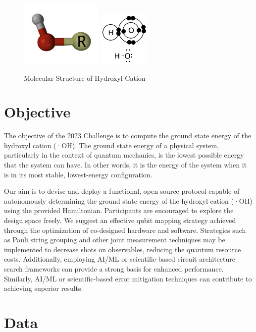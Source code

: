 \documentclass{article}
\begin{document}
\begin{figure}[h]
\centering
\includegraphics[width=4cm]{Images/Hydroxyl3D.png}
\includegraphics[width=2.5cm]{Images/Hydroxyl-OH.png}
\caption{Molecular Structure of Hydroxyl Cation}
\end{figure}

\section{Objective}

The objective of the 2023 Challenge is to compute the ground state energy of the hydroxyl cation (·OH). The ground state energy of a physical system, particularly in the context of quantum mechanics, is the lowest possible energy that the system can have. In other words, it is the energy of the system when it is in its most stable, lowest-energy configuration.

Our aim is to devise and deploy a functional, open-source protocol capable of autonomously determining the ground state energy of the hydroxyl cation (·OH) using the provided Hamiltonian. Participants are encouraged to explore the design space freely. We suggest an effective qubit mapping strategy achieved through the optimization of co-designed hardware and software. Strategies such as Pauli string grouping and other joint measurement techniques may be implemented to decrease shots on observables, reducing the quantum resource costs. Additionally, employing AI/ML or scientific-based circuit architecture search frameworks can provide a strong basis for enhanced performance. Similarly, AI/ML or scientific-based error mitigation techniques can contribute to achieving superior results.

\section{Data}
\end{document}
